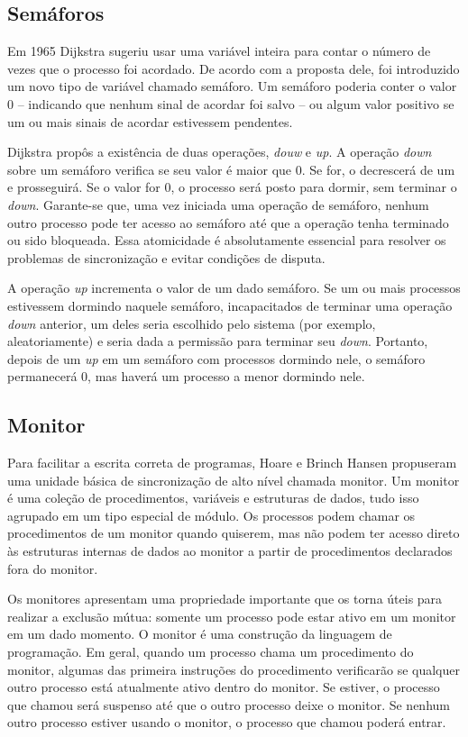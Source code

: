 \subsection{Semáforos}

Em 1965 Dijkstra sugeriu usar uma variável inteira para contar o número de vezes que o 
processo foi acordado. De acordo com a proposta dele, foi introduzido um novo tipo de 
variável chamado semáforo. Um semáforo poderia conter o valor 0 – indicando que nenhum 
sinal de acordar foi salvo – ou algum valor positivo se um ou mais sinais de acordar 
estivessem pendentes.

Dijkstra propôs a existência de duas operações,  \textit{douw} e \textit{up}. A operação \textit{down} sobre um 
semáforo verifica se seu valor é maior que 0. Se for, o decrescerá de um e prosseguirá. 
Se o valor for 0, o processo será posto para dormir, sem terminar o \textit{down}. Garante-se que, 
uma vez iniciada uma operação de semáforo, nenhum outro processo pode ter acesso ao 
semáforo até que a operação tenha terminado ou sido bloqueada. Essa atomicidade é 
absolutamente essencial para resolver os problemas de sincronização e evitar condições 
de disputa.

A operação \textit{up} incrementa o valor de um dado semáforo. Se um ou mais processos estivessem 
dormindo naquele semáforo, incapacitados de terminar uma operação \textit{down} anterior, um deles 
seria escolhido pelo sistema (por exemplo, aleatoriamente) e seria dada a permissão para 
terminar seu \textit{down}. Portanto, depois de um \textit{up} em um semáforo com processos dormindo nele, 
o semáforo permanecerá 0, mas haverá um processo a menor dormindo nele.

\subsection{Monitor}

Para facilitar a escrita correta de programas, Hoare e Brinch Hansen propuseram uma unidade 
básica de sincronização de alto nível chamada monitor.  Um monitor é uma coleção de procedimentos, 
variáveis e estruturas de dados, tudo isso agrupado em um tipo especial de módulo. Os processos 
podem chamar os procedimentos de um monitor quando quiserem, mas não podem ter acesso direto às 
estruturas internas de dados ao monitor a partir de procedimentos declarados fora do monitor.

Os monitores apresentam uma propriedade importante que os torna úteis para realizar a exclusão mútua: 
somente um processo pode estar ativo em um monitor em um dado momento. O monitor é uma construção da 
linguagem de programação. Em geral, quando um processo chama um procedimento do monitor, algumas das 
primeira instruções do procedimento verificarão  se qualquer outro processo está atualmente ativo 
dentro do monitor. Se estiver, o processo que chamou será suspenso até que o outro processo deixe o 
monitor. Se nenhum outro processo estiver usando o monitor, o processo que chamou poderá entrar.

